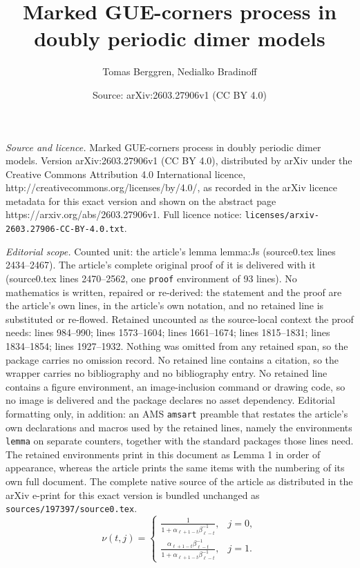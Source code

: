 \documentclass[10pt,a4paper]{amsart}
\title{Marked GUE-corners process in doubly periodic dimer models}
\author{Tomas Berggren, Nedialko Bradinoff}
\date{Source: arXiv:2603.27906v1 (CC BY 4.0)}
\begin{document}
\maketitle

\noindent\emph{Source and licence.} Marked GUE-corners process in doubly periodic dimer models. Version arXiv:2603.27906v1 (CC BY 4.0), distributed by arXiv under the Creative Commons Attribution 4.0 International licence, http://creativecommons.org/licenses/by/4.0/, as recorded in the arXiv licence metadata for this exact version and shown on the abstract page https://arxiv.org/abs/2603.27906v1. Full licence notice: \texttt{licenses/arxiv-2603.27906-CC-BY-4.0.txt}.\par\smallskip

\noindent\textit{Editorial scope.} Counted unit: the article's lemma lemma:Js (source0.tex lines 2434--2467). The article's complete original proof of it is delivered with it (source0.tex lines 2470--2562, one \texttt{proof} environment of 93 lines). No mathematics is written, repaired or re-derived: the statement and the proof are the article's own lines, in the article's own notation, and no retained line is substituted or re-flowed.  Retained uncounted as the source-local context the proof needs: lines 984--990; lines 1573--1604; lines 1661--1674; lines 1815--1831; lines 1834--1854; lines 1927--1932.  Nothing was omitted from any retained span, so the package carries no omission record.  No retained line contains a citation, so the wrapper carries no bibliography and no bibliography entry.  No retained line contains a figure environment, an image-inclusion command or drawing code, so no image is delivered and the package declares no asset dependency.  Editorial formatting only, in addition: an AMS \texttt{amsart} preamble that restates the article's own declarations and macros used by the retained lines, namely the environments \texttt{lemma} on separate counters, together with the standard packages those lines need.  The retained environments print in this document as Lemma 1 in order of appearance, whereas the article prints the same items with the numbering of its own full document.  The complete native source of the article as distributed in the arXiv e-print for this exact version is bundled unchanged as \texttt{sources/197397/source0.tex}.
\begin{equation}\label{eq:period_function}
\nu(t,j)=
\begin{cases}
\frac{1}{1+\alpha_{\ell+1-t}\beta_{\ell-t}^{-1}}, & j=0, \\
\frac{\alpha_{\ell+1-t}\beta_{\ell-t}^{-1}}{1+\alpha_{\ell+1-t}\beta_{\ell-t}^{-1}}, & j=1.
\end{cases}
\end{equation}
\end{document}
